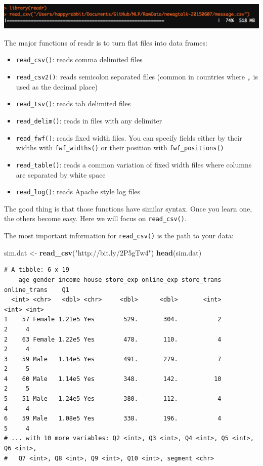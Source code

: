 \documentclass[12pt,]{krantz}
\makeatletter
\newenvironment{Shaded}{\begin{snugshade}}{\end{snugshade}}
\newcommand{\KeywordTok}[1]{\textcolor[rgb]{0.27,0.27,0.27}{\textbf{#1}}}
\newcommand{\NormalTok}[1]{#1}
\newcommand{\StringTok}[1]{\textcolor[rgb]{0.5,0.5,0.5}{#1}}
\providecommand{\tightlist}{%
  \setlength{\itemsep}{0pt}\setlength{\parskip}{0pt}}
\newenvironment{kframe}{%
\medskip{}
\setlength{\fboxsep}{.8em}
 \def\at@end@of@kframe{}%
 \ifinner\ifhmode%
  \def\at@end@of@kframe{\end{minipage}}%
  \begin{minipage}{\columnwidth}%
 \fi\fi%
 \def\FrameCommand##1{\hskip\@totalleftmargin \hskip-\fboxsep
 \colorbox{shadecolor}{##1}\hskip-\fboxsep
     \hskip-\linewidth \hskip-\@totalleftmargin \hskip\columnwidth}%
 \MakeFramed {\advance\hsize-\width
   \@totalleftmargin\z@ \linewidth\hsize
   \@setminipage}}%
 {\par\unskip\endMakeFramed%
 \at@end@of@kframe}
\renewenvironment{Shaded}{\begin{kframe}}{\end{kframe}}
\makeatother
\begin{document}
\includegraphics{images/prograssbar.png}

The major functions of readr is to turn flat files into data frames:

\begin{itemize}
\tightlist
\item
  \texttt{read\_csv()}: reads comma delimited files
\item
  \texttt{read\_csv2()}: reads semicolon separated files (common in countries where \texttt{,} is used as the decimal place)
\item
  \texttt{read\_tsv()}: reads tab delimited files
\item
  \texttt{read\_delim()}: reads in files with any delimiter
\item
  \texttt{read\_fwf()}: reads fixed width files. You can specify fields either by their widths with \texttt{fwf\_widths()} or their position with \texttt{fwf\_positions()}\\
\item
  \texttt{read\_table()}: reads a common variation of fixed width files where columns are separated by white space
\item
  \texttt{read\_log()}: reads Apache style log files
\end{itemize}

The good thing is that those functions have similar syntax. Once you learn one, the others become easy. Here we will focus on \texttt{read\_csv()}.

The most important information for \texttt{read\_csv()} is the path to your data:

\begin{Shaded}
\begin{Highlighting}[]
\NormalTok{sim.dat <-}\StringTok{ }\KeywordTok{read_csv}\NormalTok{(}\StringTok{"http://bit.ly/2P5gTw4"}\NormalTok{)}
\KeywordTok{head}\NormalTok{(sim.dat)}
\end{Highlighting}
\end{Shaded}

\begin{verbatim}
# A tibble: 6 x 19
    age gender income house store_exp online_exp store_trans online_trans    Q1
  <int> <chr>   <dbl> <chr>     <dbl>      <dbl>       <int>        <int> <int>
1    57 Female 1.21e5 Yes        529.       304.           2            2     4
2    63 Female 1.22e5 Yes        478.       110.           4            2     4
3    59 Male   1.14e5 Yes        491.       279.           7            2     5
4    60 Male   1.14e5 Yes        348.       142.          10            2     5
5    51 Male   1.24e5 Yes        380.       112.           4            4     4
6    59 Male   1.08e5 Yes        338.       196.           4            5     4
# ... with 10 more variables: Q2 <int>, Q3 <int>, Q4 <int>, Q5 <int>, Q6 <int>,
#   Q7 <int>, Q8 <int>, Q9 <int>, Q10 <int>, segment <chr>
\end{verbatim}
\end{document}
